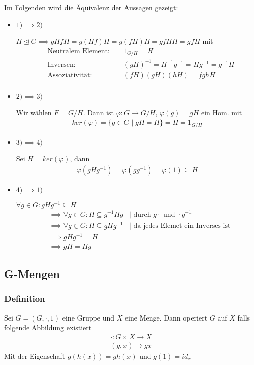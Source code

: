 \documentclass[12pt, german]{article}
\begin{document}
	Im Folgenden wird die Äquivalenz der Aussagen gezeigt: 
	\begin{itemize}
		\item $1)\implies 2)$ ~\par
		$H\trianglelefteq G \implies gHfH = g(Hf)H = g(fH)H = gfHH = gfH$ mit
		\begin{align*}
			&\text{ Neutralem Element: } &&1_{G/H} = H \\
			&\text{ Inversen: } &&(gH)^{-1} = H^{-1}g^{-1}= Hg^{-1}=g^{-1}H \\
			&\text{ Assoziativität: } &&(fH)(gH)(hH)= fghH\\
		\end{align*}
		
		\item $2)\implies 3)$ ~\par
		Wir wählen $F=G/H$.
		Dann ist $\varphi : G \to G/H $, $\varphi(g) = gH$ ein Hom. mit
		\begin{align*}
			ker(\varphi) = \{g \in G \mid gH = H\} = H = 1_{G/H}
		\end{align*}
		
		\item $3)\implies 4)$~\par
		Sei $H = ker(\varphi)$, dann
		\begin{align*}
			\varphi(gHg^{-1}) = \varphi(gg^{-1}) = \varphi(1) \subseteq H 
		\end{align*}
		
		\item $4)\implies 1)$~\par
		$\forall g \in G : gHg^{-1} \subseteq H$
		\begin{align*}
			&\implies  \forall g \in G : H \subseteq g^{-1}Hg &| \text{ durch } g\cdot \text{ und } \cdot g^{-1}\\
			&\implies \forall g \in G : H \subseteq gHg^{-1} &| \text{ da jedes Elemet ein Inverses ist}\\
			&\implies gHg^{-1} = H \\
			&\implies gH = Hg
		\end{align*}
	\end{itemize}
	
	
	
	\subsection{G-Mengen}		
	\subsubsection{Definition}
	Sei $G = (G, \cdot, 1)$ eine Gruppe und $X$ eine Menge.
	Dann operiert $G$ auf $X$ falls folgende Abbildung existiert 
	\begin{align*}
		\cdot : G \times X \to X \\ 
		(g,x) \mapsto gx
	\end{align*}
	Mit der Eigenschaft $g(h(x)) = gh(x)$ und $g(1) = id_x$
	
\end{document}
